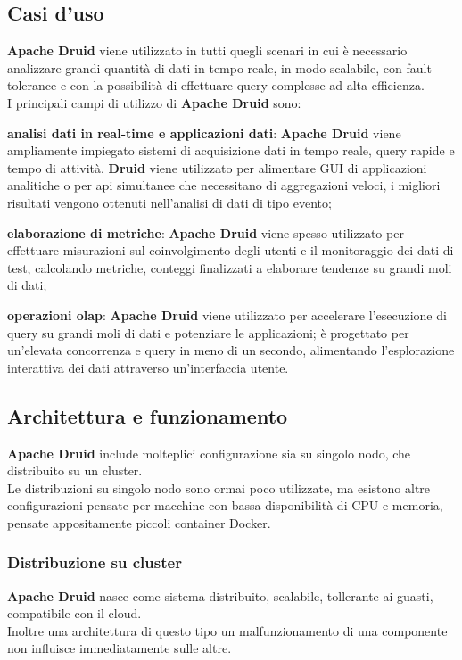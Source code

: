 \subsection{Casi d'uso}
\textbf{Apache Druid} viene utilizzato in tutti quegli scenari in cui è necessario analizzare grandi quantità di dati in tempo reale, in modo scalabile, con \gls{fault tolerance}{} e con la possibilità di effettuare query complesse ad alta efficienza.\\  
I principali campi di utilizzo di \textbf{Apache Druid} sono:
\begin{list}{*}
    \item \textbf{analisi dati in real-time e applicazioni dati}: \textbf{Apache Druid} viene ampliamente impiegato sistemi di acquisizione dati in
    tempo reale, query rapide e tempo di attività. \textbf{Druid} viene utilizzato per alimentare GUI
    di applicazioni analitiche o per \gls{api}{} simultanee che necessitano di aggregazioni veloci, i migliori risultati 
    vengono ottenuti nell'analisi di dati di tipo evento;
    \pagebreak
    \item \item \textbf{elaborazione di metriche}: \textbf{Apache Druid} viene spesso utilizzato per effettuare misurazioni sul coinvolgimento degli
    utenti e il monitoraggio dei dati di test, calcolando metriche, conteggi finalizzati a elaborare tendenze su grandi moli di dati;
    \item \textbf{operazioni \gls{olap}{}}: \textbf{Apache Druid} viene utilizzato per accelerare l’esecuzione di query su grandi moli di dati e potenziare le applicazioni; è progettato per un’elevata concorrenza e query in meno di un secondo, alimentando
    l’esplorazione interattiva dei dati attraverso un’interfaccia utente.
\end{list}
\subsection{Architettura e funzionamento}
\textbf{Apache Druid} include molteplici configurazione sia su singolo nodo, che distribuito su un \gls{cluster}{}.\\
Le distribuzioni su singolo nodo sono ormai poco utilizzate, ma esistono altre configurazioni pensate per macchine con bassa disponibilità di 
CPU e memoria, pensate appositamente piccoli \gls{container}{} \gls{Docker}{}. 
\subsubsection{Distribuzione su cluster}
\textbf{Apache Druid} nasce come sistema distribuito, scalabile, tollerante ai guasti, compatibile con il cloud. \\
Inoltre una architettura di questo tipo un malfunzionamento di una componente non influisce immediatamente sulle altre.\\

